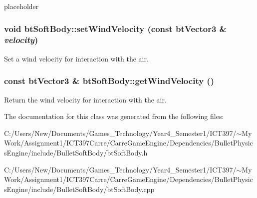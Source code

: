 placeholder \hypertarget{classbt_soft_body_ee9ac69662731fa96ae2357522972ef9}{
\subsubsection[setWindVelocity]{\setlength{\rightskip}{0pt plus 5cm}void btSoftBody::setWindVelocity (const btVector3 \& {\em velocity})}}
\label{classbt_soft_body_ee9ac69662731fa96ae2357522972ef9}


Set a wind velocity for interaction with the air. \hypertarget{classbt_soft_body_71de05c3c56952a4d76e09ca9ca9cce0}{
\subsubsection[getWindVelocity]{\setlength{\rightskip}{0pt plus 5cm}const btVector3 \& btSoftBody::getWindVelocity ()}}
\label{classbt_soft_body_71de05c3c56952a4d76e09ca9ca9cce0}


Return the wind velocity for interaction with the air. 

The documentation for this class was generated from the following files:\begin{CompactItemize}
\item 
C:/Users/New/Documents/Games\_\-Technology/Year4\_\-Semester1/ICT397/$\sim$My Work/Assignment1/ICT397Carre/CarreGameEngine/Dependencies/BulletPhysicsEngine/include/BulletSoftBody/btSoftBody.h\item 
C:/Users/New/Documents/Games\_\-Technology/Year4\_\-Semester1/ICT397/$\sim$My Work/Assignment1/ICT397Carre/CarreGameEngine/Dependencies/BulletPhysicsEngine/include/BulletSoftBody/btSoftBody.cpp\end{CompactItemize}
